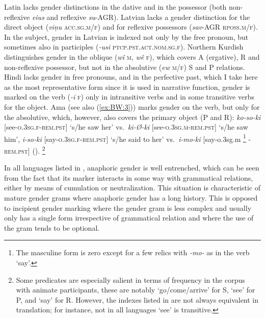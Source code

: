 \documentclass[output=collectionpaper]{langsci/langscibook}
\begin{document}
Latin lacks gender distinctions in the dative and in the possessor (both non-reflexive \textit{eius} and reflexive \textit{su}-AGR). Latvian lacks a gender distinction for the direct object (\textit{viņu} \textsc{acc.sg.m/f}) and for reflexive possessors (\textit{sav}-AGR \textsc{rposs.m/f}). In the subject, gender in Latvian is indexed not only by the free pronoun, but sometimes also in participles (\textit{-usi} \textsc{ptcp.pst.act.nom.sg.f}). Northern Kurdish distinguishes gender in the oblique (\textit{wî} \textsc{m}, \textit{wê} \textsc{f}), which covers A (ergative), R and non-reflexive possessor, but not in the absolutive (\textit{ew} \textsc{m/f}) S and P relations. Hindi lacks gender in free pronouns, and in the perfective past, which I take here as the most representative form since it is used in narrative function, gender is marked on the verb (\textit{-ī} \textsc{f}) only in intransitive verbs and in some transitive verbs for the object. Ama (see also (\ref{ex:BW:3})) marks gender on the verb, but only for the absolutive, which, however, also covers the primary object (P and R): \textit{ko-so-ki} [see-\textsc{o.3sg.f-rem.pst}] ‘s/he saw her’ vs.\ \textit{ki-Ø-ki} [see-\textsc{o.3sg.m-rem.pst}] ‘s/he saw him’, \textit{i-so-ki} [say-\textsc{o.3sg.f-rem.pst}] ‘s/he said to her’ vs.\ \textit{i-mo-ki} [say-o.3sg.m%
\footnote{%
The masculine form is zero except for a few relics with \textit{-mo-} as in the verb ‘say’.
}%
\textsc{-rem.pst}] (\citealt{Arsjoe1999}).%
\footnote{%
Some predicates are especially salient in terms of frequency in the corpus with animate participants, these are notably ‘go/come/arrive’ for S, ‘see’ for P, and ‘say’ for R. However, the indexes listed in  are not always equivalent in translation; for instance, not in all languages ‘see’ is transitive.
}%

In all languages listed in , anaphoric gender is well entrenched, which can be seen from the fact that its marker interacts in some way with grammatical relations, either by means of cumulation or neutralization. This situation is characteristic of mature gender grams where anaphoric gender has a long history. This is opposed to incipient gender marking where the gender gram is less complex and usually only has a single form irrespective of grammatical relation and where the use of the gram tends to be optional.
\end{document}
